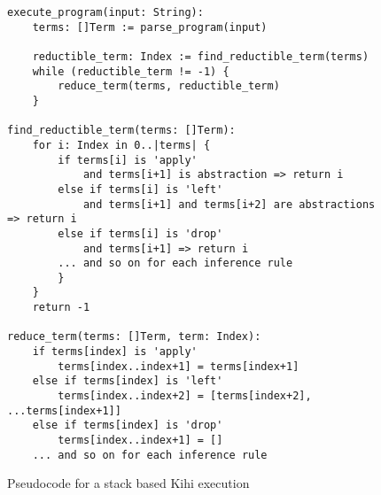 \begin{figure}[htb]
    \centering
    \begin{lstlisting}
execute_program(input: String):
    terms: []Term := parse_program(input)
    
    reductible_term: Index := find_reductible_term(terms)
    while (reductible_term != -1) {
        reduce_term(terms, reductible_term)
    }

find_reductible_term(terms: []Term):
    for i: Index in 0..|terms| {
        if terms[i] is 'apply'
            and terms[i+1] is abstraction => return i
        else if terms[i] is 'left'
            and terms[i+1] and terms[i+2] are abstractions => return i
        else if terms[i] is 'drop'
            and terms[i+1] => return i
        ... and so on for each inference rule
        }
    }
    return -1

reduce_term(terms: []Term, term: Index):
    if terms[index] is 'apply'
        terms[index..index+1] = terms[index+1]
    else if terms[index] is 'left'
        terms[index..index+2] = [terms[index+2], ...terms[index+1]]
    else if terms[index] is 'drop'
        terms[index..index+1] = []
    ... and so on for each inference rule
    \end{lstlisting}
    \caption{Pseudocode for a stack based Kihi execution}
    \label{fig:stack_pseudocode}
\end{figure}